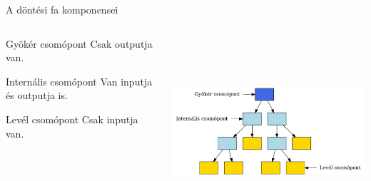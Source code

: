 \documentclass[english, aspectratio=169]{beamer}
\begin{document}
\begin{frame}{A döntési fa komponensei}
\begin{columns}
\begin{column}{.3\textwidth}
\begin{block}{Gyökér csomópont}
Csak outputja van.
\end{block}
\smallskip
\begin{block}{Internális csomópont}
Van inputja és outputja is.
\end{block}
\smallskip
\begin{block}{Levél csomópont}
Csak inputja van.
\end{block}
\end{column}
\begin{column}{.7\textwidth}
\begin{center}
\includegraphics[width=10cm, height=7cm, keepaspectratio]{graphs/decision_trees_3.png}
\end{center}
\end{column}
\end{columns}
\end{frame}
\end{document}
